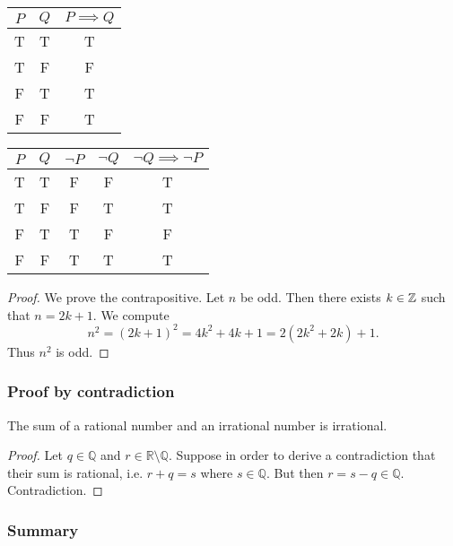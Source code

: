 \documentclass{article}
\begin{document}
        \vspace{1.5em}
\begin{tabular}{|c|c| c|}
\hline
     $P$& $Q$ &  $P \implies Q$ \\ \hline
     T& T & T \\ \hline
     T & F & F \\ \hline
     F & T & T \\ \hline
     F & F & T \\ \hline
\end{tabular}   \hspace{2cm}  \begin{tabular}{|c | c | c |  c | c |}
\hline
     $P$& $Q$ & $\neg P$ &  $\neg Q$ & $\neg Q \implies \neg P$ \\ \hline
     T& T & F & F & T \\ \hline
     T & F & F &  T & T \\ \hline
     F & T &  T  & F & F \\ \hline
     F & F & T & T & T \\ \hline
\end{tabular}
\vspace{1.5em}


\begin{proof}
We prove the contrapositive. Let $n$ be odd. Then there exists $k \in {\mathbb{Z}}$ such that $n = 2k + 1$. We compute
$$n^2 = (2k + 1)^2 = 4k^2 + 4k + 1 = 2(2k^2+2k) + 1.$$
Thus $n^2$ is odd.

\end{proof}


\subsubsection{Proof by contradiction}
\begin{example}
The sum of a rational number and an irrational number is irrational.
\end{example}

\begin{proof}
Let $q \in \mathbb{Q}$ and $r \in \mathbb{R} \setminus \mathbb{Q}$.
Suppose in order to derive a contradiction that their sum is rational, i.e. $ r + q = s$ where $s \in \mathbb{Q}$.
But then $r = s - q \in \mathbb{Q}$. Contradiction.
\end{proof}




\subsubsection{Summary}
\end{document}

